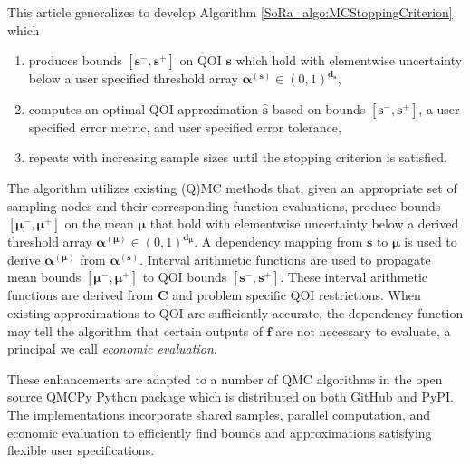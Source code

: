 \documentclass[graybox]{svmult}
\begin{document}
This article generalizes \cite{adaptive_qmc} to develop Algorithm \ref{SoRa_algo:MCStoppingCriterion} which 
\begin{enumerate}
    \item produces bounds $[\boldsymbol{s}^-,\boldsymbol{s}^+]$ on QOI $\boldsymbol{s}$ which hold with elementwise uncertainty below a user specified threshold array $\boldsymbol{\alpha}^{(\boldsymbol{s})} \in (0,1)^{\boldsymbol{d}_{\boldsymbol{s}}}$, 
    \item computes an optimal QOI approximation $\hat{\boldsymbol{s}}$ based on bounds $[\boldsymbol{s}^-,\boldsymbol{s}^+]$, a user specified error metric, and user specified error tolerance,
    \item repeats with increasing sample sizes until the stopping criterion is satisfied. 
\end{enumerate}
The algorithm utilizes existing (Q)MC methods that, given an appropriate set of sampling nodes and their corresponding function evaluations, produce bounds $[\boldsymbol{\mu}^-,\boldsymbol{\mu}^+]$ on the mean $\boldsymbol{\mu}$ that hold with elementwise uncertainty below a derived threshold array $\boldsymbol{\alpha}^{(\boldsymbol{\mu})} \in (0,1)^{\boldsymbol{d}_{\boldsymbol{\mu}}}$. A dependency mapping from $\boldsymbol{s}$ to $\boldsymbol{\mu}$ is used to derive $\boldsymbol{\alpha}^{(\boldsymbol{\mu})}$ from $\boldsymbol{\alpha}^{(\boldsymbol{s})}$. Interval arithmetic functions are used to propagate mean bounds $[\boldsymbol{\mu}^-,\boldsymbol{\mu}^+]$ to QOI bounds $[\boldsymbol{s}^-,\boldsymbol{s}^+]$. These interval arithmetic functions are derived from $\boldsymbol{C}$ and problem specific QOI restrictions. When existing approximations to QOI are sufficiently accurate, the dependency function may tell the algorithm that certain outputs of $\boldsymbol{f}$ are not necessary to evaluate, a principal we call \emph{economic evaluation}. 

These enhancements are adapted to a number of QMC algorithms in the open source QMCPy Python package \cite{QMCPy} which is distributed on both GitHub and PyPI. The implementations incorporate shared samples, parallel computation, and economic evaluation to efficiently find bounds and approximations satisfying flexible user specifications.
\end{document}
